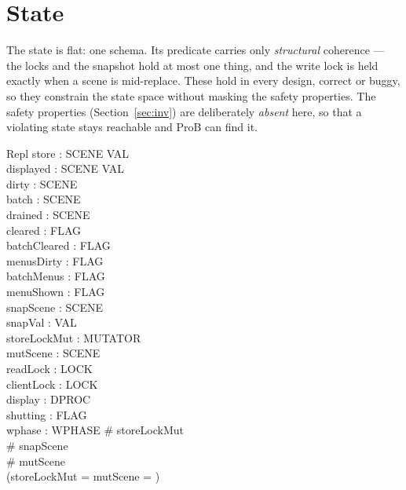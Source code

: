 \documentclass[a4paper,10pt,fleqn]{article}
\begin{document}
\section{State}

The state is flat: one schema.  Its predicate carries only
\emph{structural} coherence --- the locks and the snapshot hold at most one
thing, and the write lock is held exactly when a scene is mid-replace.
These hold in every design, correct or buggy, so they constrain the state
space without masking the safety properties.  The safety properties
(Section~\ref{sec:inv}) are deliberately \emph{absent} here, so that a
violating state stays reachable and ProB can find it.

\begin{schema}{Repl}
  store : SCENE \fun VAL \\
  displayed : SCENE \fun VAL \\
  dirty : \power SCENE \\
  batch : \power SCENE \\
  drained : \power SCENE \\
  cleared : FLAG \\
  batchCleared : FLAG \\
  menusDirty : FLAG \\
  batchMenus : FLAG \\
  menuShown : FLAG \\
  snapScene : \power SCENE \\
  snapVal : VAL \\
  storeLockMut : \power MUTATOR \\
  mutScene : \power SCENE \\
  readLock : LOCK \\
  clientLock : LOCK \\
  display : DPROC \\
  shutting : FLAG \\
  wphase : WPHASE
\where
  \# storeLockMut  \\
  \# snapScene  \\
  \# mutScene  \\
  (storeLockMut = \emptyset \iff mutScene = \emptyset)
\end{schema}
\end{document}
